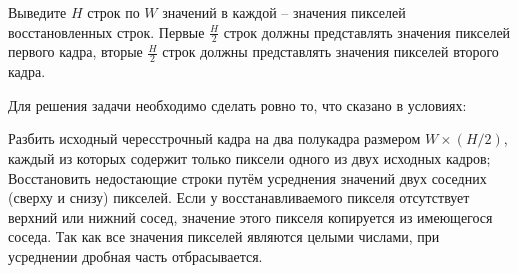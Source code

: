 \outputfmtSection

Выведите $ H $ строк по $ W $ значений в каждой – значения пикселей
восстановленных  строк. Первые $ \frac{H}{2} $ строк должны представлять значения пикселей
первого кадра, вторые $ \frac{H}{2} $ строк должны представлять значения пикселей
второго кадра.

\solutionSection

Для решения задачи необходимо сделать ровно то, что сказано в условиях:

Разбить исходный чересстрочный кадра на два полукадра размером $W \times (H/2)$, каждый из которых содержит 
только пиксели одного из двух исходных кадров; Восстановить недостающие строки путём усреднения 
значений двух соседних (сверху и снизу) пикселей. Если у восстанавливаемого пикселя отсутствует верхний 
или нижний сосед, значение этого пикселя копируется из имеющегося соседа. Так как все значения пикселей 
являются целыми числами, при усреднении дробная часть отбрасывается.

